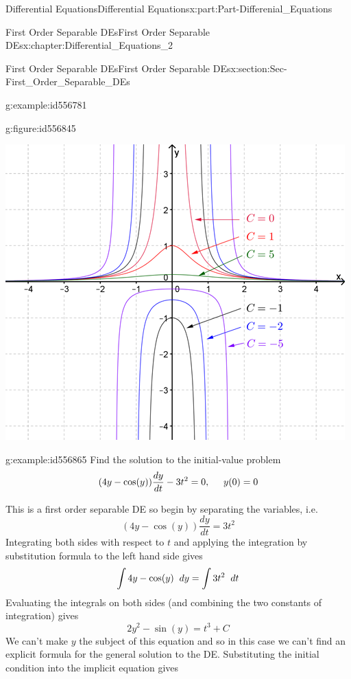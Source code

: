 \documentclass[oneside,10pt,]{book}
\numberwithin{equation}{section}
\begin{document}
\begin{partptx}{Differential Equations}{}{Differential Equations}{}{}{x:part:Part-Differenial_Equations}
\begin{chapterptx}{First Order Separable DEs}{}{First Order Separable DEs}{}{}{x:chapter:Differential_Equations_2}
\begin{sectionptx}{First Order Separable DEs}{}{First Order Separable DEs}{}{}{x:section:Sec-First_Order_Separable_DEs}
\begin{example}{}{g:example:id556781}
\begin{figureptx}{}{g:figure:id556845}{}
\begin{image}{0.125}{0.75}{0.125}
\includegraphics[width=\linewidth]{./DifferentialEquations/Images/2/1_example3.png}
\end{image}%
\tcblower
\end{figureptx}%
%
\end{example}
\begin{example}{}{g:example:id556865}%
Find the solution to the initial-value problem%
\begin{equation*}
(4y-\cos(y))\frac{dy}{dt}-3t^2=0, \hspace{5mm} y(0)=0
\end{equation*}
%
\par\smallskip%
\noindent\hypertarget{g:solution:id556890}{}This is a first order separable DE so begin by separating the variables, i.e.%
\begin{equation*}
(4y-\cos(y))\frac{dy}{dt}=3t^2
\end{equation*}
Integrating both sides with respect to \(t\) and applying the integration by substitution formula to the left hand side gives%
\begin{equation*}
\int 4y-\cos(y)\hspace{2mm} dy=\int 3t^2\hspace{2mm} dt
\end{equation*}
Evaluating the integrals on both sides (and combining the two constants of integration) gives%
\begin{equation*}
2y^2-\sin(y)=t^3+C
\end{equation*}
We can’t make \(y\) the subject of this equation and so in this case we can’t find an explicit formula for the general solution to the DE. Substituting the initial condition into the implicit equation gives%

\end{example}
\end{sectionptx}
\end{chapterptx}
\end{partptx}
\end{document}
